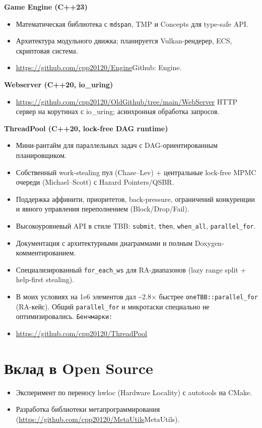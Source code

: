 \documentclass[a4paper,10pt]{article}
\begin{document}
\textbf{Game Engine (C++23)}  
\begin{itemize}[noitemsep]
    \item Математическая библиотека с \texttt{mdspan}, TMP и Concepts для type-safe API.
    \item Архитектура модульного движка; планируется Vulkan-рендерер, ECS, скриптовая система.
    \item \url{https://github.com/cpp20120/Engine}{Github: Engine}.
\end{itemize}

\textbf{Webserver (C++20, io\_uring)}  
\begin{itemize}[noitemsep]
    \item \url{https://github.com/cpp20120/OldGithub/tree/main/WebServer} HTTP сервер на корутинах с io\_uring; асинхронная обработка запросов.
\end{itemize}

\textbf{ThreadPool (C++20, lock-free DAG runtime)}  
\begin{itemize}[noitemsep]
    \item Мини-рантайм для параллельных задач с DAG-ориентированным планировщиком.
    \item Собственный work-stealing пул (Chase–Lev) + центральные lock-free MPMC очереди (Michael–Scott) с Hazard Pointers/QSBR.
    \item Поддержка аффинити, приоритетов, back-pressure, ограничений конкуренции и явного управления переполнением (Block/Drop/Fail).
    \item Высокоуровневый API в стиле TBB: \texttt{submit}, \texttt{then}, \texttt{when\_all}, \texttt{parallel\_for}.
    \item Документация с архитектурными диаграммами и полным Doxygen-комментированием.
    \item Специализированный \texttt{for\_each\_ws} для RA-диапазонов (lazy range split + help-first stealing). 
    \item В моих условиях на 1e6 элементов дал \textasciitilde{}2{.}8× быстрее \texttt{oneTBB::parallel\_for} (RA-кейс). Общий \texttt{parallel\_for} и микротаски специально не оптимизировались.
    \texttt{Бенчмарки:}
    \item \url{https://github.com/cpp20120/ThreadPool}
\end{itemize}

\section*{Вклад в Open Source}
\begin{itemize}[noitemsep]
    \item Эксперимент по переносу hwloc (Hardware Locality) с autotools на CMake.
    \item Разработка библиотеки метапрограммирования (\url{https://github.com/cpp20120/MetaUtils}{MetaUtils}).
\end{itemize}
\end{document}
